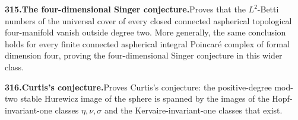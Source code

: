 \documentclass[11pt,a4paper]{article}
\begin{document}
  \par \begin{minipage}{\linewidth}
  \fontsize{10.5}{12.6}\selectfont\RaggedRight
  \hypertarget{result 315}{}
  {\bfseries\textcolor{muted}{315.}\enspace The four-dimensional Singer conjecture.}\enspace Proves that the $L^2$-Betti numbers of the universal cover of every closed connected aspherical topological four-manifold vanish outside degree two. More generally, the same conclusion holds for every finite connected aspherical integral Poincar\'e complex of formal dimension four, proving the four-dimensional Singer conjecture in this wider class.\par
  \end{minipage}\par\vspace{5pt}



  \par \begin{minipage}{\linewidth}
  \fontsize{10.5}{12.6}\selectfont\RaggedRight
  \hypertarget{result 316}{}
  {\bfseries\textcolor{muted}{316.}\enspace Curtis’s conjecture.}\enspace Proves Curtis’s conjecture: the positive-degree mod-two stable Hurewicz image of the sphere is spanned by the images of the Hopf-invariant-one classes $\eta,\nu,\sigma$ and the Kervaire-invariant-one classes that exist.\par
  \end{minipage}\par\vspace{5pt}
\end{document}
